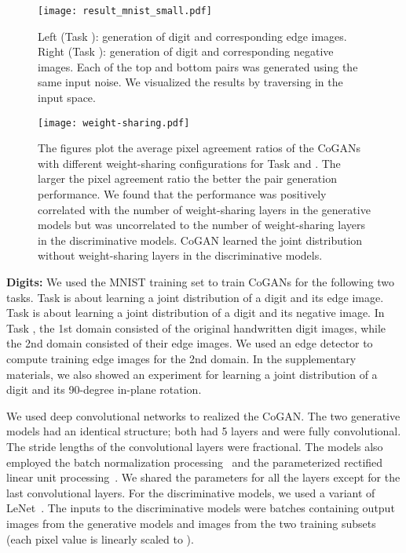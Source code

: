 \documentclass{article}
\begin{document}
\begin{figure}[t]
\centering
\texttt{[image: result\_mnist\_small.pdf]}
\caption{\small Left (Task ): generation of digit and corresponding edge images. Right (Task ): generation of digit and corresponding negative images. Each of the top and bottom pairs was generated using the same input noise. We visualized the results by traversing in the input space.}
\label{fig::result_mnist}
\centering
\texttt{[image: weight-sharing.pdf]}
\caption{\small The figures plot the average pixel agreement ratios of the CoGANs with different weight-sharing configurations for Task  and . The larger the pixel agreement ratio the better the pair generation performance. We found that the performance was positively correlated with the number of weight-sharing layers in the generative models but was uncorrelated to the number of weight-sharing layers in the discriminative models. CoGAN learned the joint distribution without weight-sharing layers in the discriminative models.}
\label{fig::quantitative_digit}
\vspace{-2mm}
\end{figure}

{\bf Digits:} We used the MNIST training set to train CoGANs for the following two tasks. Task  is about learning a joint distribution of a digit and its edge image. Task  is about learning a joint distribution of a digit and its negative image. In Task , the 1st domain consisted of the original handwritten digit images, while the 2nd domain consisted of their edge images. We used an edge detector to compute training edge images for the 2nd domain. In the supplementary materials, we also showed an experiment for learning a joint distribution of a digit and its 90-degree in-plane rotation.

We used deep convolutional networks to realized the CoGAN. The two generative models had an identical structure; both had 5 layers and were fully convolutional. The stride lengths of the convolutional layers were fractional. The models also employed the batch normalization processing~\cite{ioffe2015batch} and the parameterized rectified linear unit processing~\cite{he2015delving}. We shared the parameters for all the layers except for the last convolutional layers. For the discriminative models, we used a variant of LeNet~\cite{lecun1998gradient}. The inputs to the discriminative models were batches containing output images from the generative models and images from the two training subsets (each pixel value is linearly scaled to ). 
\end{document}
